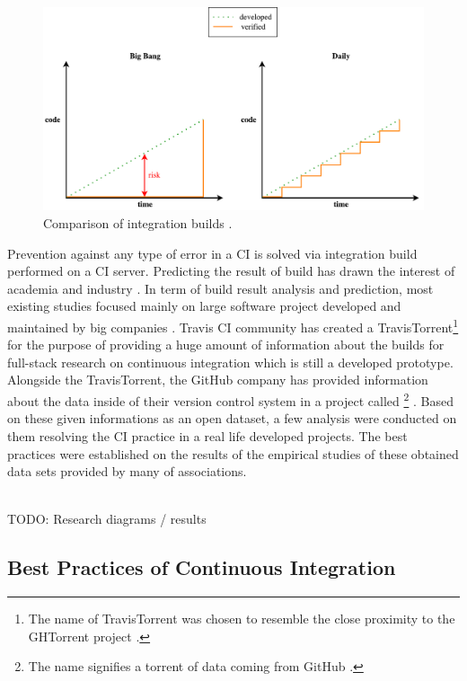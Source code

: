 \begin{figure}[H]
	\centering
	\includegraphics[scale=0.5]{img/big_bang_vs_daily_build.pdf}
	\caption{Comparison of integration builds \cite{AaltoUniversity}.}
	\label{fig:integration}
\end{figure}

Prevention against any type of error in a CI is solved via integration build performed on a CI server. Predicting the result of build has drawn the interest of academia and industry \cite{ResultsOfCIbuild}. In term of build result analysis and prediction, most existing studies focused mainly on large software project developed and maintained by big companies \cite{ResultsOfCIbuild}. Travis CI community has created a TravisTorrent\footnote{The name of TravisTorrent was chosen to resemble the close proximity to the GHTorrent project \cite{TravisTorrentWEBPAGE}.} \cite{TravisTorrent} for the purpose of providing a huge amount of information about the builds for full-stack research on continuous integration which is still a developed prototype. Alongside the TravisTorrent, the GitHub company has provided information about the data inside of their version control system in a project called \footnote{The name signifies a torrent of data coming from GitHub \cite{GHTorrentWEBPAGE}.} \cite{GHTorrent}. Based on these given informations as an open dataset, a few analysis were conducted on them resolving the CI practice in a real life developed projects. The best practices were established on the results of the empirical studies of these obtained data sets provided by many of associations.

\hfill\\
{\color{red}TODO: Research diagrams / results}

\subsection{Best Practices of Continuous Integration}

